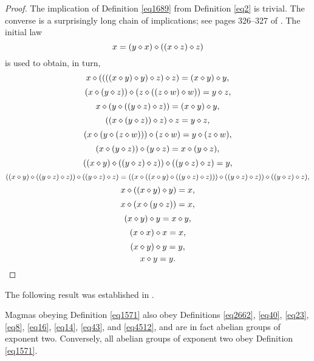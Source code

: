 \begin{proof}\leanok  The implication of Definition \ref{eq1689} from Definition \ref{eq2} is trivial.  The converse is a surprisingly long chain of implications; see pages 326--327 of \cite{Kisielewicz2}.  The initial law
$$ x = (y \diamond x) \diamond ((x \diamond z) \diamond z)$$
is used to obtain, in turn,
$$ x \diamond ((((x \diamond y) \diamond y) \diamond z) \diamond z) = (x \diamond y) \diamond y,$$
$$(x \diamond (y \diamond z)) \diamond (z \diamond ((z \diamond w) \diamond w)) = y \diamond z,$$
$$x \diamond (y \diamond ((y \diamond z) \diamond z)) = (x \diamond y) \diamond y,$$
$$((x \diamond (y \diamond z)) \diamond z) \diamond z = y \diamond z,$$
$$(x \diamond (y \diamond (z \diamond w))) \diamond (z \diamond w) = y \diamond (z \diamond w),$$
$$(x \diamond (y \diamond z)) \diamond (y \diamond z) = x \diamond (y \diamond z),$$
$$((x \diamond y) \diamond ((y \diamond z) \diamond z)) \diamond ((y \diamond z) \diamond z) = y,$$
$$((x \diamond y) \diamond ((y \diamond z) \diamond z)) \diamond ((y \diamond z) \diamond z) = ((x \diamond ((x \diamond y) \diamond ((y \diamond z) \diamond z))) \diamond ((y \diamond z) \diamond z)) \diamond ((y \diamond z) \diamond z),$$
$$ x \diamond ((x \diamond y) \diamond y) = x,$$
$$ x \diamond (x \diamond (y \diamond z)) = x,$$
$$ (x \diamond y) \diamond y = x \diamond y,$$
$$ (x \diamond x) \diamond x = x,$$
$$ (x \diamond y) \diamond y = y,$$
$$ x \diamond y = y.$$
\end{proof}

The following result was established in \cite{mendelsohn-padmanabhan}.

\begin{theorem}[Consequences of 1571]\label{1571_impl}\leanok  Magmas obeying Definition \ref{eq1571} also obey Definitions \ref{eq2662}, \ref{eq40}, \ref{eq23}, \ref{eq8}, \ref{eq16}, \eqref{eq14}, \ref{eq43}, and \ref{eq4512}, and are in fact abelian groups of exponent two.  Conversely, all abelian groups of exponent two obey Definition \ref{eq1571}.
\end{theorem}

